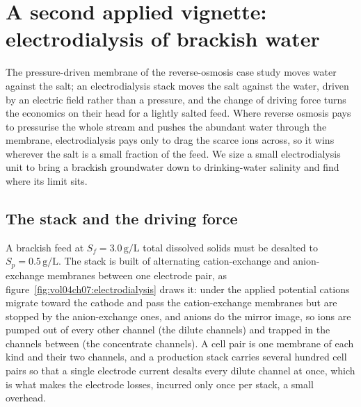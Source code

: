 \section{A second applied vignette: electrodialysis of brackish
water}

The pressure-driven membrane of the reverse-osmosis case study moves water
against the salt; an electrodialysis stack moves the salt against the water,
driven by an electric field rather than a pressure, and the change of driving
force turns the economics on their head for a lightly salted feed. Where
reverse osmosis pays to pressurise the whole stream and pushes the abundant
water through the membrane, electrodialysis pays only to drag the scarce ions
across, so it wins wherever the salt is a small fraction of the feed. We size
a small electrodialysis unit to bring a brackish groundwater down to
drinking-water salinity and find where its limit sits.

\subsection*{The stack and the driving force}

A brackish feed at $S_f = 3.0\,\text{g/L}$ total dissolved solids must be
desalted to $S_p = 0.5\,\text{g/L}$. The stack is built of alternating
cation-exchange and anion-exchange membranes between one electrode pair, as
figure~\ref{fig:vol04ch07:electrodialysis} draws it: under the applied
potential cations migrate toward the cathode and pass the cation-exchange
membranes but are stopped by the anion-exchange ones, and anions do the
mirror image, so ions are pumped out of every other channel (the dilute
channels) and trapped in the channels between (the concentrate channels). A
cell pair is one membrane of each kind and their two channels, and a
production stack carries several hundred cell pairs so that a single electrode
current desalts every dilute channel at once, which is what makes the
electrode losses, incurred only once per stack, a small overhead.



